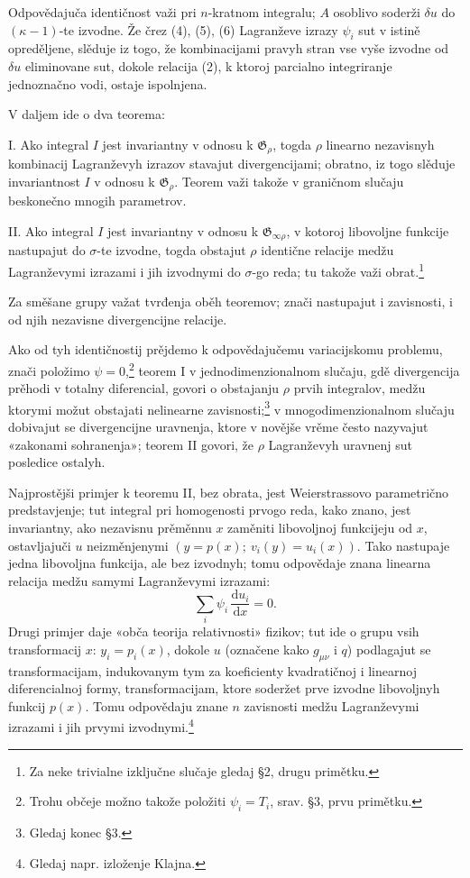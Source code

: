 \documentclass[11pt]{article}
\providecommand{\G}{\mathfrak G}
\providecommand{\dd}{\mathrm d}
\begin{document}
Odpovědajuča identičnost važi pri \(n\)-kratnom integralu; \(A\) osoblivo soderži \(\delta u\) do \((\kappa-1)\)-te izvodne. Že črez (4), (5), (6) Lagranževe izrazy \(\psi_i\) sut v istině opreděljene, slěduje iz togo, že kombinacijami pravyh stran vse vyše izvodne od \(\delta u\) eliminovane sut, dokole relacija (2), k ktoroj parcialno integriranje jednoznačno vodi, ostaje ispolnjena.

V daljem ide o dva teorema:

I. Ako integral \(I\) jest invariantny v odnosu k \(\G_\rho\), togda \(\rho\) linearno nezavisnyh kombinacij Lagranževyh izrazov stavajut divergencijami; obratno, iz togo slěduje invariantnost \(I\) v odnosu k \(\G_\rho\). Teorem važi takože v graničnom slučaju beskonečno mnogih parametrov.

II. Ako integral \(I\) jest invariantny v odnosu k \(\G_{\infty\rho}\), v kotoroj libovoljne funkcije nastupajut do \(\sigma\)-te izvodne, togda obstajut \(\rho\) identične relacije medžu Lagranževymi izrazami i jih izvodnymi do \(\sigma\)-go reda; tu takože važi obrat.\footnote{Za neke trivialne izključne slučaje gledaj \S{}2, drugu primětku.}

Za směšane grupy važat tvrđenja oběh teoremov; znači nastupajut i zavisnosti, i od njih nezavisne divergencijne relacije.

Ako od tyh identičnostij prějdemo k odpovědajučemu variacijskomu problemu, znači položimo \(\psi=0\),\footnote{Trohu občeje možno takože položiti \(\psi_i=T_i\), srav. \S{}3, prvu primětku.} teorem I v jednodimenzionalnom slučaju, gdě divergencija prěhodi v totalny diferencial, govori o obstajanju \(\rho\) prvih integralov, medžu ktorymi možut obstajati nelinearne zavisnosti;\footnote{Gledaj konec \S{}3.} v mnogodimenzionalnom slučaju dobivajut se divergencijne uravnenja, ktore v novějše vrěme često nazyvajut «zakonami sohranenja»; teorem II govori, že \(\rho\) Lagranževyh uravnenj sut posledice ostalyh.

Najprostějši primjer k teoremu II, bez obrata, jest Weierstrassovo parametrično predstavjenje; tut integral pri homogenosti prvogo reda, kako znano, jest invariantny, ako nezavisnu prěměnnu \(x\) zaměniti libovoljnoj funkcijeju od \(x\), ostavljajuči \(u\) neizměnjenymi \((y=p(x);\ v_i(y)=u_i(x))\). Tako nastupaje jedna libovoljna funkcija, ale bez izvodnyh; tomu odpovědaje znana linearna relacija medžu samymi Lagranževymi izrazami:
\[
\sum_i \psi_i\,\frac{\dd u_i}{\dd x}=0.
\]
Drugi primjer daje «obča teorija relativnosti» fizikov; tut ide o grupu vsih transformacij \(x\): \(y_i=p_i(x)\), dokole \(u\) (označene kako \(g_{\mu\nu}\) i \(q\)) podlagajut se transformacijam, indukovanym tym za koeficienty kvadratičnoj i linearnoj diferencialnoj formy, transformacijam, ktore soderžet prve izvodne libovoljnyh funkcij \(p(x)\). Tomu odpovědaju znane \(n\) zavisnosti medžu Lagranževymi izrazami i jih prvymi izvodnymi.\footnote{Gledaj napr. izloženje Klajna.}
\end{document}
